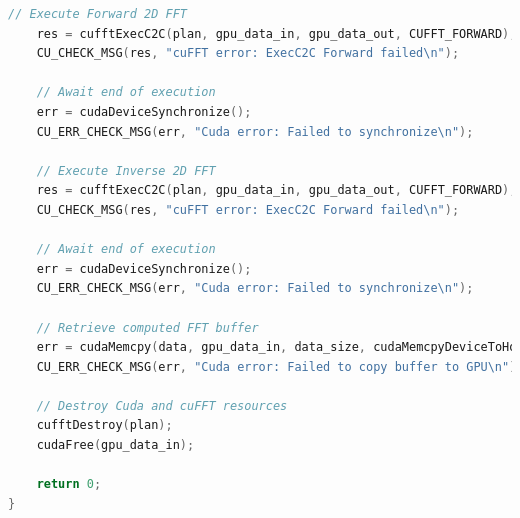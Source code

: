 \documentclass[
  oneside,
  11pt, a4paper,
  footinclude=true,
  headinclude=true,
  cleardoublepage=empty
]{scrbook}
\begin{document}
\begin{lstlisting}[language=C++,caption={cuFFT, see \autoref{sec:cufft}},label={lst:cufft}]
    // Execute Forward 2D FFT
    res = cufftExecC2C(plan, gpu_data_in, gpu_data_out, CUFFT_FORWARD);
    CU_CHECK_MSG(res, "cuFFT error: ExecC2C Forward failed\n");
    
    // Await end of execution
    err = cudaDeviceSynchronize();
    CU_ERR_CHECK_MSG(err, "Cuda error: Failed to synchronize\n");
    
    // Execute Inverse 2D FFT
    res = cufftExecC2C(plan, gpu_data_in, gpu_data_out, CUFFT_FORWARD);
    CU_CHECK_MSG(res, "cuFFT error: ExecC2C Forward failed\n");
    
    // Await end of execution
    err = cudaDeviceSynchronize();
    CU_ERR_CHECK_MSG(err, "Cuda error: Failed to synchronize\n");
    
    // Retrieve computed FFT buffer
    err = cudaMemcpy(data, gpu_data_in, data_size, cudaMemcpyDeviceToHost);
    CU_ERR_CHECK_MSG(err, "Cuda error: Failed to copy buffer to GPU\n");
    
    // Destroy Cuda and cuFFT resources
    cufftDestroy(plan);
    cudaFree(gpu_data_in);

    return 0;
}
\end{lstlisting}








\end{document}
